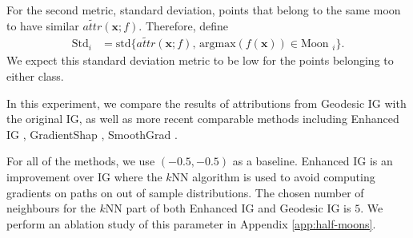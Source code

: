 For the second metric, standard deviation, points that belong to the same moon to have similar $\widetilde{attr}(\textbf{x}; f)$. Therefore, define
\begin{equation}
\begin{split}
    \textrm{Std}_i &= \textrm{std}\{\widetilde{attr}(\textbf{x}; f), \, \textrm{argmax}(f(\textbf{x})) \in \textrm{Moon }_i\}.
\end{split}
\label{eq:moons-std}
\end{equation}
We expect this standard deviation metric to be low for the points belonging to either class. 

In this experiment, we compare the results of attributions from Geodesic IG with the original IG, as well as more recent comparable methods including Enhanced IG \citep{jha2020enhanced}, GradientShap \citep{lundberg2017unified}, SmoothGrad \citep{smilkov2017smoothgrad}.

For all of the methods, we use $(-0.5, -0.5)$ as a baseline. Enhanced IG is an improvement over IG where the $k$NN algorithm is used to avoid computing gradients on paths on out of sample distributions. The chosen number of neighbours for the $k$NN part of both Enhanced IG and Geodesic IG is $5$. We perform an ablation study of this parameter in Appendix \ref{app:half-moons}. 

\begin{table}[t]
	\centering
	\caption{Evaluation of different attribution methods on a half-moons dataset with Gaussian noise $\mathcal{N}(0, 0.2)$. The results over 5 different seeds are averaged, with the corresponding standard deviation in brackets. We present in Appendix \ref{app:half-moons} more results with different amounts of Gaussian noise.}
	\label{tab:results_moons_2}
\end{table}

